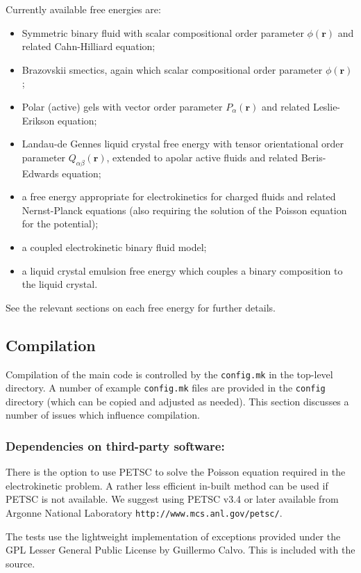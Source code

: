 Currently available free energies are:
\begin{itemize}
\item Symmetric binary fluid with scalar compositional order parameter
$\phi(\mathbf{r})$ and related Cahn-Hilliard equation;
\item Brazovskii smectics, again which scalar compositional order parameter
$\phi(\mathbf{r})$;
\item Polar (active) gels with vector order parameter $P_\alpha (\mathbf{r})$
and related Leslie-Erikson equation;
\item Landau-de Gennes liquid crystal free energy with tensor
orientational order parameter $Q_{\alpha\beta}(\mathbf{r})$, extended to
apolar active fluids and related Beris-Edwards equation;
\item a free energy appropriate for electrokinetics for charged fluids
and related Nernst-Planck equations (also requiring the solution of the
Poisson equation for the potential);
\item a coupled electrokinetic binary fluid model;
\item a liquid crystal emulsion free energy which couples a binary
composition to the liquid crystal.
\end{itemize}
See the relevant sections on each free energy for further details.

\subsection{Compilation}

Compilation of the main code is controlled by the \texttt{config.mk} in
the  top-level directory. A number of example \texttt{config.mk} files
are provided in the \texttt{config} directory (which can be copied and
adjusted as needed). This section discusses a number of issues
which influence compilation.

\subsubsection{Dependencies on third-party software:}
There is the option to use PETSC to solve the Poisson equation required in
the electrokinetic problem. A rather less efficient in-built method
can be used if PETSC is not available.
We suggest using PETSC
v3.4 or later available from Argonne National Laboratory
\texttt{http://www.mcs.anl.gov/petsc/}.

The tests use the lightweight implementation of exceptions provided
under the GPL Lesser General Public License by Guillermo Calvo. This
is included with the source.

